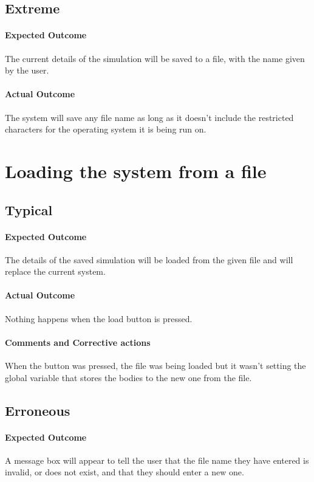 \subsection{Extreme}
\paragraph{Expected Outcome}
The current details of the simulation will be saved to a file, with the name
given by the user.
\paragraph{Actual Outcome}
The system will save any file name as long as it doesn't include the restricted
characters for the operating system it is being run on.


\section{Loading the system from a file}
\subsection{Typical}
\paragraph{Expected Outcome}
The details of the saved simulation will be loaded from the given file and will
replace the current system.
\paragraph{Actual Outcome}
Nothing happens when the load button is pressed.
\paragraph{Comments and Corrective actions}
When the button was pressed, the file was being loaded but it wasn't setting the
global variable that stores the bodies to the new one from the file.

\subsection{Erroneous}
\paragraph{Expected Outcome}
A message box will appear to tell the user that the file name they have entered
is invalid, or does not exist, and that they should enter a new one.
